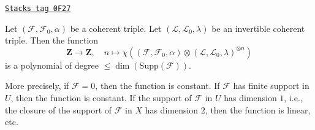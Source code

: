 \begin{proposition}
\label{algebraization-proposition-hilbert-triple}
\href{https://stacks.math.columbia.edu/tag/0F27}{\texttt{Stacks tag 0F27}}

Let $(\mathcal{F}, \mathcal{F}_0, \alpha)$ be a coherent triple.
Let $(\mathcal{L}, \mathcal{L}_0, \lambda)$ be an invertible coherent
triple. Then the function
$$
\mathbf{Z} \longrightarrow \mathbf{Z},\quad
n \longmapsto
\chi((\mathcal{F}, \mathcal{F}_0, \alpha) \otimes
(\mathcal{L}, \mathcal{L}_0, \lambda)^{\otimes n})
$$
is a polynomial of degree $\leq \dim(\text{Supp}(\mathcal{F}))$.
\end{proposition}

More precisely, if $\mathcal{F} = 0$, then the function is constant.
If $\mathcal{F}$ has finite support in $U$, then the function is constant.
If the support of $\mathcal{F}$ in $U$ has dimension $1$, i.e., the
closure of the support of $\mathcal{F}$ in $X$ has dimension $2$, then
the function is linear, etc.

